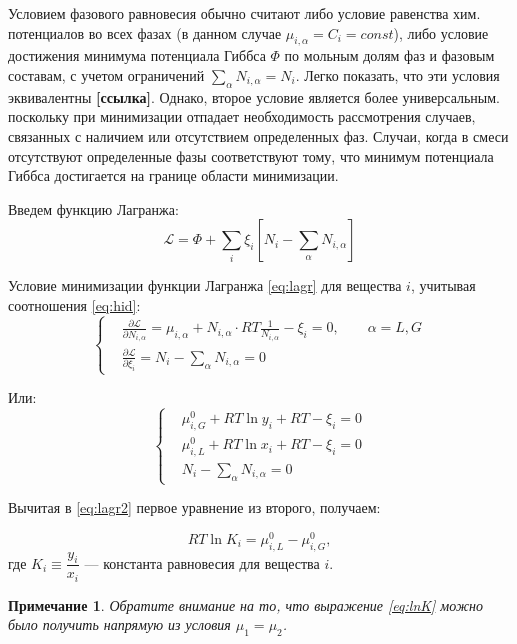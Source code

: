 \documentclass[12pt]{article}
\newcommand{\pd}[2]{\frac{\partial #1}{\partial #2}}
\newtheorem{note}{Примечание}[section]
\begin{document}
Условием фазового равновесия обычно считают либо условие равенства хим. потенциалов во всех фазах (в данном случае $\mu_{i, \alpha} = C_i = const$), либо условие достижения минимума потенциала Гиббса $\Phi$ по мольным долям фаз и фазовым составам, с учетом ограничений $\sum_\alpha N_{i, \alpha} = N_i$. Легко показать, что эти условия эквивалентны \textbf{[ссылка]}. Однако, второе условие является более универсальным. поскольку при минимизации отпадает необходимость рассмотрения случаев, связанных с наличием или отсутствием определенных фаз. Случаи, когда в смеси отсутствуют определенные фазы соответствуют тому, что минимум потенциала Гиббса достигается на границе области минимизации.

Введем функцию Лагранжа:
\begin{equation}
\mathscr{L} = \Phi + \sum_i\xi_i \left[N_i - \sum_\alpha N_{i, \alpha} \right]
\label{eq:lagr}
\end{equation} 


Условие минимизации функции Лагранжа \eqref{eq:lagr} для вещества $i$, учитывая соотношения \eqref{eq:hid}:
\[
\left\{
\begin{aligned}
& \pd{\mathscr{L}}{N_{i, \alpha}} = \mu_{i, \alpha} + N_{i, \alpha} \cdot RT \frac{1}{N_{i, \alpha}} - \xi_i = 0, \qquad \alpha=L, G \\
& \pd{\mathscr{L}}{\xi_i} = N_i - \sum_{\alpha} N_{i,\alpha} = 0 
\end{aligned}
\right.
\]

Или:
\begin{equation}
\left\{
\begin{aligned}
& \mu_{i, G}^0 + RT \ln y_i + RT - \xi_i = 0\\
& \mu_{i, L}^0 + RT \ln x_i + RT - \xi_i = 0\\
& N_i - \sum_{\alpha} N_{i,\alpha} = 0
\end{aligned}
\label{eq:lagr2}
\right.
\end{equation}

Вычитая в \eqref{eq:lagr2} первое уравнение из второго, получаем:

\begin{equation}
RT \ln K_i = \mu_{i, L}^0 - \mu_{i, G}^0,
\label{eq:lnK}
\end{equation}
где $K_i \equiv \dfrac{y_i}{x_i}$ --- константа равновесия для вещества $i$.


\begin{note}
Обратите внимание на то, что выражение \eqref{eq:lnK} можно было получить напрямую из условия $\mu_1 = \mu_2$.
\end{note}
\end{document}
